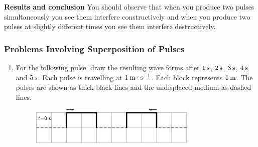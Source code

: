 \par 
\label{m38802*id614134}\noindent{}\textbf{Results and conclusion}
You should observe that when you produce two pulses simultaneously you see them interfere constructively and when you produce two pulses at slightly different times you see them interfere destructively.
\par \label{m38802*secfhsst!!!underscore!!!id636}
            \subsubsection{ Problems Involving Superposition of Pulses }
            \nopagebreak
            \label{m38802*id316401}\begin{enumerate}[noitemsep, label=\textbf{\arabic*}. ] 
            \label{m38802*uid55}\item For the following pulse, draw the resulting wave forms after \begin{math}1\phantom{\rule{2pt}{0ex}}\mathrm{s}\end{math}, \begin{math}2\phantom{\rule{2pt}{0ex}}\mathrm{s}\end{math}, \begin{math}3\phantom{\rule{2pt}{0ex}}\mathrm{s}\end{math}, \begin{math}4\phantom{\rule{2pt}{0ex}}\mathrm{s}\end{math} and \begin{math}5\phantom{\rule{2pt}{0ex}}\mathrm{s}\end{math}. Each pulse is travelling at \begin{math}1\phantom{\rule{2pt}{0ex}}\mathrm{m}\ensuremath{\cdot}\mathrm{s}{}^{-1}\end{math}. Each block represents \begin{math}1\phantom{\rule{2pt}{0ex}}\mathrm{m}\end{math}. The pulses are shown as thick black lines and the undisplaced medium as dashed lines.

    \setcounter{subfigure}{0}


	\begin{figure}[H] %
    \begin{center}
    \label{m38802*id316460!!!underscore!!!media}\label{m38802*id316460!!!underscore!!!printimage}\includegraphics[width=300px]{col11305.imgs/m38802_PG10C4_024.png} %
        

\end{center}
\end{figure}
\end{enumerate}
